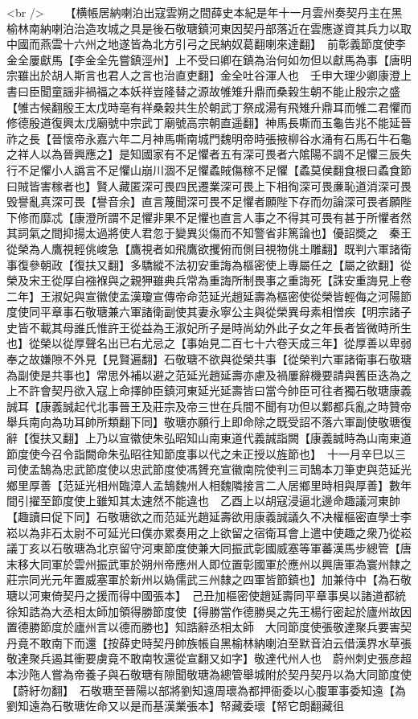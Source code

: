 <br />
　　【横帳居納喇泊出寇雲朔之間薛史本紀是年十一月雲州奏契丹主在黑榆林南納喇泊治造攻城之具是後石敬瑭鎮河東因契丹部落近在雲應遂資其兵力以取中國而燕雲十六州之地遂皆為北方引弓之民納奴葛翻喇來達翻】　前彰義節度使李金全屢獻馬【李金全先嘗鎮涇州】上不受曰卿在鎮為治何如勿但以獻馬為事【唐明宗雖出於胡人斯言也君人之言也治直吏翻】金全吐谷渾人也　壬申大理少卿康澄上書曰臣聞童謡非禍福之本妖祥豈隆替之源故雊雉升鼎而桑榖生朝不能止殷宗之盛【雊古候翻殷王太戊時亳有祥桑榖共生於朝武丁祭成湯有飛雉升鼎耳而雊二君懼而修德殷道復興太戊廟號中宗武丁廟號高宗朝直遥翻】神馬長嘶而玉龜告兆不能延晉祚之長【晉懷帝永嘉六年二月神馬嘶南城門魏明帝時張掖柳谷水涌有石馬石牛石龜之祥人以為晉興應之】是知國家有不足懼者五有深可畏者六隂陽不調不足懼三辰失行不足懼小人譌言不足懼山崩川涸不足懼蟊賊傷稼不足懼【蟊莫侯翻食根曰蟊食節曰賊皆害稼者也】賢人藏匿深可畏四民遷業深可畏上下相徇深可畏亷恥道消深可畏毁譽亂真深可畏【譽音余】直言蔑聞深可畏不足懼者願陛下存而勿論深可畏者願陛下修而靡忒【康澄所謂不足懼非果不足懼也直言人事之不得其可畏有甚于所懼者然其詞氣之間抑揚太過將使人君忽于變異災傷而不知警省非篤論也】優詔奬之　秦王從榮為人鷹視輕佻峻急【鷹視者如飛鷹欲攫俯而側目視物佻土雕翻】既判六軍諸衛事復參朝政【復扶又翻】多驕縱不法初安重誨為樞密使上專屬任之【屬之欲翻】從榮及宋王從厚自襁褓與之親狎雖典兵常為重誨所制畏事之重誨死【誅安重誨見上卷二年】王淑妃與宣徽使孟漢瓊宣傳帝命范延光趙延壽為樞密使從榮皆輕侮之河陽節度使同平章事石敬瑭兼六軍諸衛副使其妻永寧公主與從榮異母素相憎疾【明宗諸子史皆不載其母誰氏惟許王從益為王淑妃所子是時尚幼外此子女之年長者皆微時所生也】從榮以從厚聲名出已右尤忌之【事始見二百七十六卷天成三年】從厚善以卑弱奉之故嫌隙不外見【見賢遍翻】石敬瑭不欲與從榮共事【從榮判六軍諸衛事石敬瑭為副使是共事也】常思外補以避之范延光趙延壽亦慮及禍屢辭機要請與舊臣迭為之上不許會契丹欲入寇上命擇帥臣鎮河東延光延壽皆曰當今帥臣可往者獨石敬瑭康義誠耳【康義誠起代北事晉王及莊宗及帝三世在兵間不聞有功但以鄴都兵亂之時贊帝舉兵南向為功耳帥所類翻下同】敬瑭亦願行上即命除之既受詔不落六軍副使敬瑭復辭【復扶又翻】上乃以宣徽使朱弘昭知山南東道代義誠詣闕【康義誠時為山南東道節度使今召令詣闕命朱弘昭往知節度事以代之未正授以旌節也】　十一月辛巳以三司使孟鵠為忠武節度使以忠武節度使馮贇充宣徽南院使判三司鵠本刀筆吏與范延光鄉里厚善【范延光相州臨漳人孟鵠魏州人相魏隣接言二人居鄉里時相與厚善】數年間引擢至節度使上雖知其太速然不能違也　乙酉上以胡寇浸逼北邊命趣議河東帥【趣讀曰促下同】石敬瑭欲之而范延光趙延壽欲用康義誠議久不决權樞密直學士李崧以為非石太尉不可延光曰僕亦累奏用之上欲留之宿衛耳會上遣中使趣之衆乃從崧議丁亥以石敬瑭為北京留守河東節度使兼大同振武彰國威塞等軍蕃漢馬步總管【唐末移大同軍於雲州振武軍於朔州帝應州人即位置彰國軍於應州以興唐軍為寰州隸之莊宗同光元年置威塞軍於新州以媯儒武三州隸之四軍皆節鎮也】加兼侍中【為石敬瑭以河東倚契丹之援而得中國張本】　己丑加樞密使趙延壽同平章事吳以諸道都統徐知誥為大丞相太師加領得勝節度使【得勝當作德勝吳之先王楊行密起於廬州故因置德勝節度於廬州言以德而勝也】知誥辭丞相太師　大同節度使張敬達聚兵要害契丹竟不敢南下而還【按薛史時契丹帥族帳自黑榆林納喇泊至默音泊云借漢界水草張敬達聚兵遏其衝要虜竟不敢南牧還從宣翻又如字】敬達代州人也　蔚州刺史張彦超本沙陁人嘗為帝養子與石敬瑭有隙聞敬瑭為總管舉城附於契丹契丹以為大同節度使【蔚紆勿翻】　石敬瑭至晉陽以部將劉知遠周瓌為都押衙委以心腹軍事委知遠【為劉知遠為石敬瑭佐命又以是而基漢業張本】帑藏委瓌【帑它朗翻藏徂